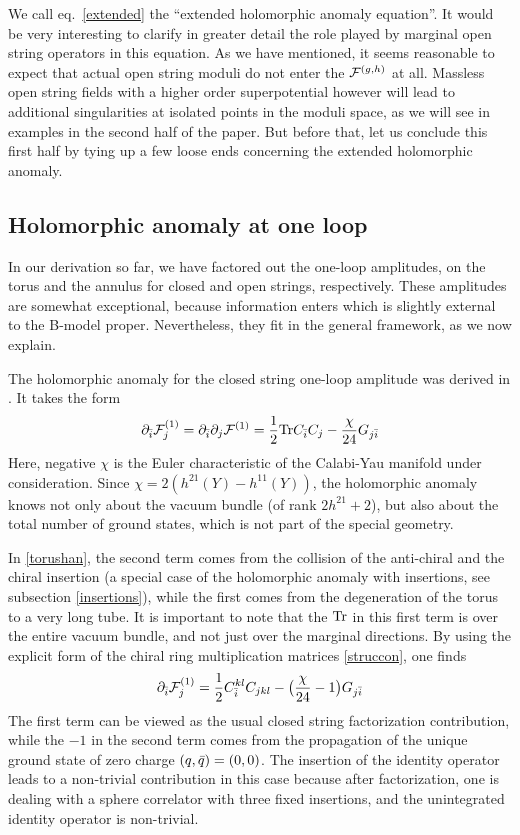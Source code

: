 We call eq.\ \eqref{extended} the ``extended holomorphic anomaly
equation''. It would be very interesting to clarify in greater 
detail the role played by marginal open string operators in this
equation. As we have mentioned, it seems reasonable to expect 
that actual open string moduli do not enter the ${{\cal F}}^{(g,h)}$ at all.
Massless open string fields with a higher order superpotential 
however will lead to additional singularities at isolated points 
in the moduli space, as we will see in examples in the second half 
of the paper. But before that, let us conclude this first half
by tying up a few loose ends concerning the extended holomorphic
anomaly.


\subsection{Holomorphic anomaly at one loop}
\label{oneloophan}

In our derivation so far, we have factored out the one-loop amplitudes,
on the torus and the annulus for closed and open strings, respectively. 
These amplitudes are somewhat exceptional, because information enters 
which is slightly external to the B-model proper. Nevertheless, they 
fit in the general framework, as we now explain.

The holomorphic anomaly for the closed string one-loop amplitude
was derived in \cite{bcov1}. It takes the form
\begin{equation}
\eqlabel{torushan}
\del_\ib \Fc 1_j = 
\del_\ib\del_j \Fc 1 = \frac 12\tr C_\ib C_j - \frac\chi{24} G_{j\ib}
\end{equation}
Here, negative $\chi$ is the Euler characteristic of the 
Calabi-Yau manifold under consideration. Since 
$\chi=2(h^{21}(Y)-h^{11}(Y))$, the holomorphic anomaly knows 
not only about the vacuum bundle (of rank $2h^{21}+2$), but also 
about the total number of ground states, which is not part of
the special geometry.

In \eqref{torushan}, the second term comes from the collision
of the anti-chiral and the chiral insertion (a special case of
the holomorphic anomaly with insertions, see subsection \ref{insertions}),
while the first comes from the degeneration of the torus to a very 
long tube. It is important to note that the ${\rm Tr}$ in this first 
term is over the entire vacuum bundle, and not just over the marginal
directions. By using the explicit form of the chiral ring 
multiplication matrices \eqref{struccon}, one finds
\begin{equation}
\partial_{\bar i} {{\cal F}}^{(1)}_j = \frac 12 C_{{\bar i}}^{kl} C_{jkl} - 
\bigl(\frac\chi{24}-1\bigr)G_{j{\bar i}}
\end{equation}
The first term can be viewed as the usual closed string factorization
contribution, while the $-1$ in the second term comes from the propagation 
of the unique ground state of zero charge $(q,{\bar q})=(0,0)$. The insertion 
of the identity operator leads to a non-trivial contribution in this
case because after factorization, one is dealing with a sphere correlator
with three fixed insertions, and the unintegrated identity operator is 
non-trivial. 

